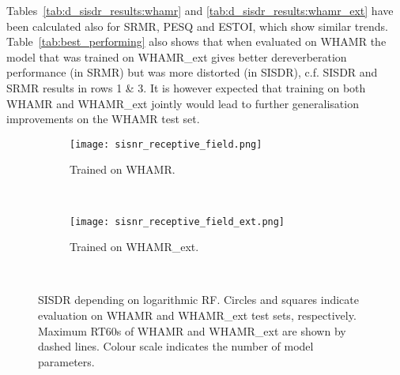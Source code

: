 \documentclass[conference,a4paper]{IEEEtran}
\begin{document}
Tables~\ref{tab:d_sisdr_results:whamr} and \ref{tab:d_sisdr_results:whamr_ext} have been calculated also for \ac{SRMR}, \ac{PESQ} and \ac{ESTOI}, which show similar trends. Table~\ref{tab:best_performing} also shows that when evaluated on WHAMR the model that was trained on WHAMR\_ext gives better dereverberation performance (in \ac{SRMR}) but was more distorted (in \ac{SISDR}), c.f. \ac{SISDR} and \ac{SRMR} results in rows 1 \& 3. It is however expected that training on both WHAMR and WHAMR\_ext jointly would lead to further generalisation improvements on the WHAMR test set.

\begin{figure}[h]
\centering
    \begin{subfigure}[b]{\columnwidth}
        \centering
        \texttt{[image: sisnr\_receptive\_field.png]}\\[-1.5ex]
        \caption{ Trained on WHAMR.}
        \label{fig:sisnr:a}
    \end{subfigure}\\[-0.5ex]
    \begin{subfigure}[b]{\columnwidth}
        \centering
        \texttt{[image: sisnr\_receptive\_field\_ext.png]}\\[-1.5ex]
        \caption{ Trained on WHAMR\_ext.}
        \label{fig:sisnr:b}
    \end{subfigure}\\[-0.5ex]
    \caption{SISDR depending on logarithmic \ac{RF}. Circles and squares indicate evaluation on WHAMR and WHAMR\_ext test sets, respectively. Maximum RT60s of WHAMR and WHAMR\_ext are shown by dashed lines. Colour scale indicates the number of model parameters.}
    \label{fig:sisnr}
\end{figure}
\end{document}
